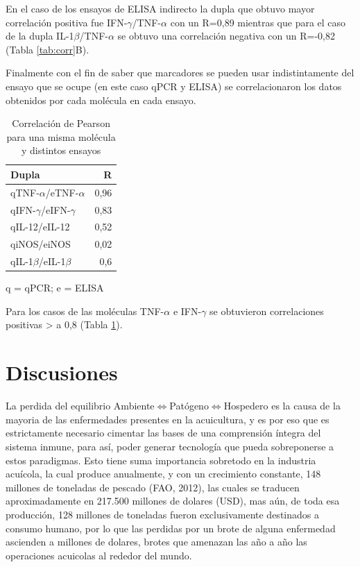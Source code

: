 \documentclass[12pt,letterpaper,oneside]{scrbook}
\begin{document}
En el caso de los ensayos de ELISA indirecto la dupla que obtuvo mayor
correlación positiva fue IFN-\(\gamma\)/TNF-\(\alpha\) con un R=0,89
mientras que para el caso de la dupla IL-1\(\beta\)/TNF-\(\alpha\) se
obtuvo una correlación negativa con un R=-0,82 (Tabla \ref{tab:corr}B).

Finalmente con el fin de saber que marcadores se pueden usar
indistintamente del ensayo que se ocupe (en este caso qPCR y ELISA) se
correlacionaron los datos obtenidos por cada molécula en cada ensayo.

\begin{table}[h!]
\centering
\begin{threeparttable}
\caption{Correlación de Pearson para una misma molécula y distintos ensayos}\label{r.pcr}\label{tab:corrtotal}
\begin{tabularx}{10cm}{X r}
  \toprule
    Dupla   &  R \\
  \midrule
qTNF-$\alpha$/eTNF-$\alpha$ & {\color{OliveGreen}0,96} \\
qIFN-$\gamma$/eIFN-$\gamma$ & {\color{OliveGreen}0,83} \\
qIL-12/eIL-12 & 0,52 \\
qiNOS/eiNOS & 0,02 \\
qIL-1$\beta$/eIL-1$\beta$ & 0,6 \\
 \bottomrule
   \end{tabularx}
   \begin{tablenotes}
    \item q = qPCR; e = ELISA
\end{tablenotes}
\end{threeparttable}
\end{table}

Para los casos de las moléculas TNF-\(\alpha\) e IFN-\(\gamma\) se
obtuvieron correlaciones positivas \textgreater{} a 0,8 (Tabla
\ref{tab:corrtotal}). \chapter{Discusiones}

La perdida del equilibrio
Ambiente\(\Leftrightarrow\)Patógeno\(\Leftrightarrow\)Hospedero es la
causa de la mayoria de las enfermedades presentes en la acuicultura, y
es por eso que es estrictamente necesario cimentar las bases de una
comprensión íntegra del sistema inmune, para así, poder generar
tecnología que pueda sobreponerse a estos paradigmas. Esto tiene suma
importancia sobretodo en la industria acuícola, la cual produce
anualmente, y con un crecimiento constante, 148 millones de toneladas de
pescado (FAO, 2012), las cuales se traducen aproximadamente en 217.500
millones de dolares (USD), mas aún, de toda esa producción, 128 millones
de toneladas fueron exclusivamente destinados a consumo humano, por lo
que las perdidas por un brote de alguna enfermedad ascienden a millones
de dolares, brotes que amenazan las año a año las operaciones acuicolas
al rededor del mundo.
\end{document}
